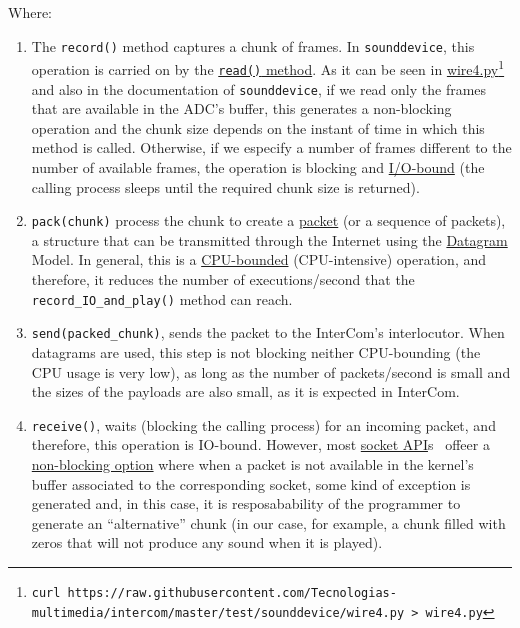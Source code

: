 Where:

\begin{enumerate}
\item The \verb|record()| method captures a chunk of frames. In
  \verb|sounddevice|, this operation is carried on by the
  \href{https://python-sounddevice.readthedocs.io/en/0.4.0/api/streams.html#sounddevice.Stream.read}{\texttt{read()}
    method}. As it can be seen in
  \href{https://raw.githubusercontent.com/Tecnologias-multimedia/intercom/master/test/sounddevice/wire4.py}{wire4.py}\footnote{
  \texttt{curl
    https://raw.githubusercontent.com/Tecnologias-multimedia/intercom/master/test/sounddevice/wire4.py
    > wire4.py}} and also in the documentation of
  \verb|sounddevice|, if we read only the frames that are available
  in the ADC's buffer, this generates a non-blocking operation and the chunk
  size depends on the instant of time in which this method is
  called. Otherwise, if we especify a number of frames different to
  the number of available frames, the operation is blocking and
  \href{https://en.wikipedia.org/wiki/I/O_bound}{I/O-bound} (the
  calling process sleeps until the required chunk size is returned).

\item \verb|pack(chunk)| process the chunk to create a
  \href{https://en.wikipedia.org/wiki/Network_packet}{packet} (or a
  sequence of packets), a structure that can be transmitted through
  the Internet using the
  \href{https://en.wikipedia.org/wiki/Datagram}{Datagram} Model. In
  general, this is a
  \href{https://en.wikipedia.org/wiki/CPU-bound}{CPU-bounded}
  (CPU-intensive) operation, and therefore, it reduces the number of
  executions/second that the \verb|record_IO_and_play()| method can
  reach.

\item \verb|send(packed_chunk)|, sends the packet to the
  InterCom's interlocutor. When datagrams are used, this step is
  not blocking neither CPU-bounding (the CPU usage is very low), as
  long as the number of packets/second is small and the sizes of the
  payloads are also small, as it is expected in InterCom.

\item \verb|receive()|, waits (blocking the calling process) for an
  incoming packet, and therefore, this operation is IO-bound. However,
  most \href{https://docs.python.org/3/library/socket.html}{socket
    API}s~\cite{python} offeer a
  \href{https://docs.python.org/3.8/library/socket.html#socket.socket.setblocking}{non-blocking
    option} where when a packet is not available in the kernel's
  buffer associated to the corresponding socket, some kind of
  exception is generated and, in this case, it is resposabability of
  the programmer to generate an ``alternative'' chunk (in our case,
  for example, a chunk filled with zeros that will not produce any
  sound when it is played).


\end{enumerate}
